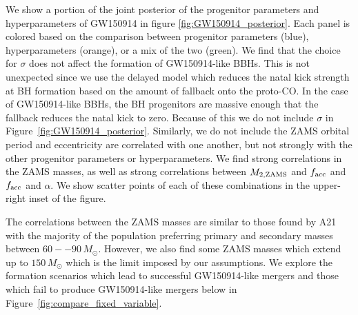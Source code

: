\documentclass[twocolumn]{aastex631}
\begin{document}
We show a portion of the joint posterior of the progenitor parameters 
and hyperparameters of GW150914 in figure \ref{fig:GW150914_posterior}. 
Each panel is colored based on the comparison between progenitor parameters (blue), hyperparameters (orange), or 
a mix of the two (green). 
We find that the choice for $\sigma$ does not affect the formation of GW150914-like BBHs. This is not unexpected 
since we use the \citet{Fryer2012} delayed model which reduces the natal kick strength at BH formation based on the amount
of fallback onto the proto-CO. In the case of GW150914-like BBHs, the BH progenitors are massive enough that the 
fallback reduces the natal kick to zero. Because of this we do not include $\sigma$ in Figure~\ref{fig:GW150914_posterior}.
Similarly, we do not include the ZAMS orbital period and eccentricity are correlated with one another, but not strongly with the other progenitor
parameters or hyperparameters. We find strong correlations in the ZAMS masses, as well as 
strong correlations between $M_{2,\rm{ZAMS}}$ and $f_{\rm{acc}}$ and $f_{\rm{acc}}$ and $\alpha$. We show scatter points of each of these 
combinations in the upper-right inset of the figure.

The correlations between the ZAMS masses are similar to those found by A21 with the majority of the population preferring primary 
and secondary masses between $60--90\,M_{\odot}$. However, we also find some ZAMS masses which extend up to $150\,M_{\odot}$ which 
is the limit imposed by our assumptions. We explore the formation scenarios which lead to successful GW150914-like mergers and those 
which fail to produce GW150914-like mergers below in Figure~\ref{fig:compare_fixed_variable}.
\end{document}
